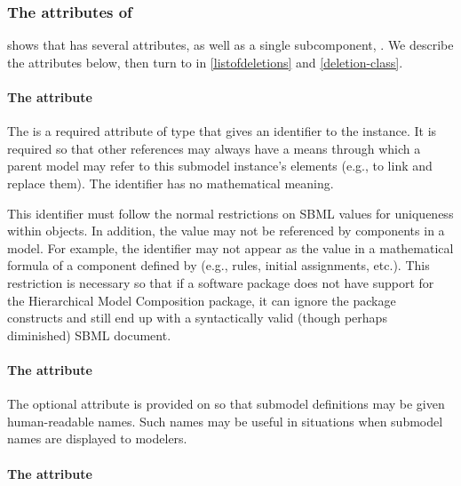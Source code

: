 \subsubsection{The attributes of }

 shows that \Submodel has several attributes, as well
as a single subcomponent, .  We describe the
attributes below, then turn to  in
\ref{listofdeletions} and \ref{deletion-class}.


\paragraph{The \fixttspace{} attribute}

The  is a required attribute of type  that gives
an identifier to the \Submodel instance.  It is required so that other
references may always have a means through which a parent model may
refer to this submodel instance's elements (e.g., to link and replace
them).  The identifier has no mathematical meaning.

This identifier must follow the normal restrictions on SBML
 values for uniqueness within \Model objects.  In
addition, the  value may not be referenced by \sbmlthreecore
components in a model.  For example, the identifier may not appear
as the  value in a mathematical formula of a component
defined by \sbmlthreecore (e.g., rules, initial assignments, etc.).
This restriction is necessary so that if a software package does not
have support for the Hierarchical Model Composition package, it can
ignore the package constructs and still end up with a syntactically
valid (though perhaps diminished) SBML document.


\paragraph{The \fixttspace{} attribute}

The optional  attribute is provided on \Submodel so that
submodel definitions may be given human-readable names.  Such names may
be useful in situations when submodel names are displayed to modelers.


\paragraph{The \fixttspace{} attribute}
\label{submodel-modelref}
  
